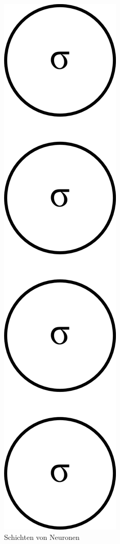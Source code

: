 \begin{figure}
	\centering
	\includegraphics[scale=1]{images/neuron-layer.png}
	\caption{Schichten von Neuronen}
	\label{fig:neuron-layer}
\end{figure}

